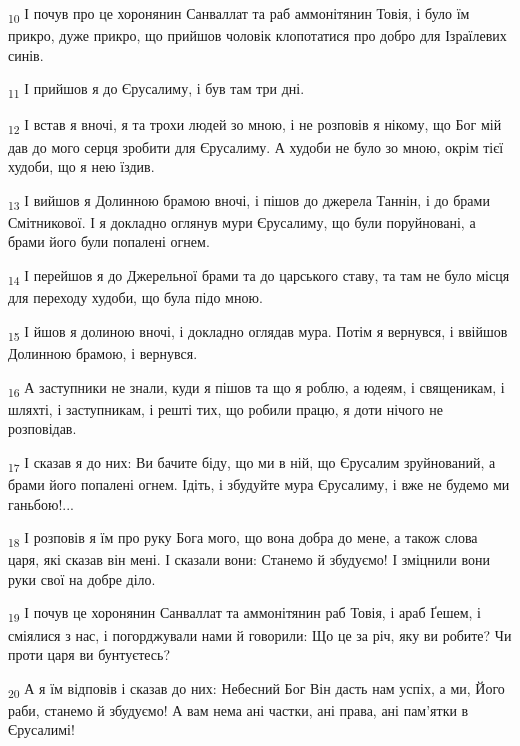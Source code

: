 \begin{tcolorbox}
\textsubscript{10} І почув про це хоронянин Санваллат та раб аммонітянин Товія, і було їм прикро, дуже прикро, що прийшов чоловік клопотатися про добро для Ізраїлевих синів.
\end{tcolorbox}
\begin{tcolorbox}
\textsubscript{11} І прийшов я до Єрусалиму, і був там три дні.
\end{tcolorbox}
\begin{tcolorbox}
\textsubscript{12} І встав я вночі, я та трохи людей зо мною, і не розповів я нікому, що Бог мій дав до мого серця зробити для Єрусалиму. А худоби не було зо мною, окрім тієї худоби, що я нею їздив.
\end{tcolorbox}
\begin{tcolorbox}
\textsubscript{13} І вийшов я Долинною брамою вночі, і пішов до джерела Таннін, і до брами Смітникової. І я докладно оглянув мури Єрусалиму, що були поруйновані, а брами його були попалені огнем.
\end{tcolorbox}
\begin{tcolorbox}
\textsubscript{14} І перейшов я до Джерельної брами та до царського ставу, та там не було місця для переходу худоби, що була підо мною.
\end{tcolorbox}
\begin{tcolorbox}
\textsubscript{15} І йшов я долиною вночі, і докладно оглядав мура. Потім я вернувся, і ввійшов Долинною брамою, і вернувся.
\end{tcolorbox}
\begin{tcolorbox}
\textsubscript{16} А заступники не знали, куди я пішов та що я роблю, а юдеям, і священикам, і шляхті, і заступникам, і решті тих, що робили працю, я доти нічого не розповідав.
\end{tcolorbox}
\begin{tcolorbox}
\textsubscript{17} І сказав я до них: Ви бачите біду, що ми в ній, що Єрусалим зруйнований, а брами його попалені огнем. Ідіть, і збудуйте мура Єрусалиму, і вже не будемо ми ганьбою!...
\end{tcolorbox}
\begin{tcolorbox}
\textsubscript{18} І розповів я їм про руку Бога мого, що вона добра до мене, а також слова царя, які сказав він мені. І сказали вони: Станемо й збудуємо! І зміцнили вони руки свої на добре діло.
\end{tcolorbox}
\begin{tcolorbox}
\textsubscript{19} І почув це хоронянин Санваллат та аммонітянин раб Товія, і араб Ґешем, і сміялися з нас, і погорджували нами й говорили: Що це за річ, яку ви робите? Чи проти царя ви бунтуєтесь?
\end{tcolorbox}
\begin{tcolorbox}
\textsubscript{20} А я їм відповів і сказав до них: Небесний Бог Він дасть нам успіх, а ми, Його раби, станемо й збудуємо! А вам нема ані частки, ані права, ані пам'ятки в Єрусалимі!
\end{tcolorbox}
